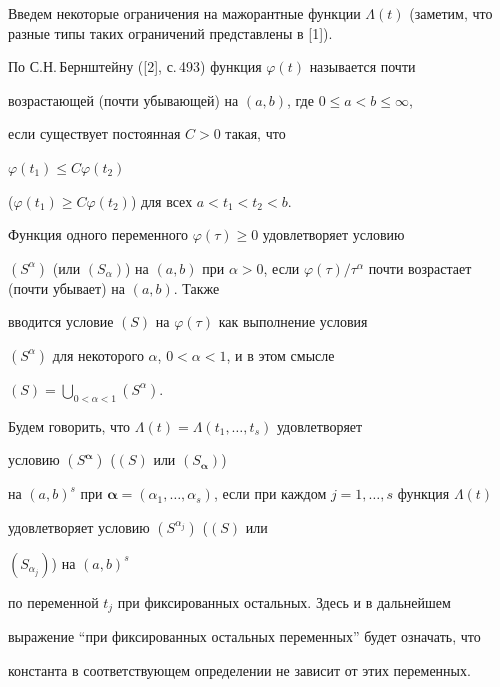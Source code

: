 Введем некоторые ограничения на мажорантные функции $\Lambda


(t)$ (заметим, что разные типы таких ограничений представлены в [1]).





По С.Н.\,Бернштейну ([2], с.\,493) функция $\varphi(t)$ называется почти


возрастающей (почти убывающей) на $(a,b)$, где $0\leq a<b\leq \infty$,


если существует постоянная $C>0$ такая, что 


$\varphi(t_1)\leq C\varphi(t_2)$ 


($\varphi(t_1) \geq C \varphi (t_2)$) для всех $a< t_1<t_2 <b$.





Функция одного переменного $\varphi(\tau) \geq 0$ удовлетворяет условию


$(S^{\alpha})$ (или $(S_{\alpha})$) на $(a,b)$ при $\alpha>0$, если $\varphi


(\tau)/\tau^{\alpha}$ почти возрастает (почти убывает) на $(a,b)$. Также 


вводится условие $(S)$ на $\varphi(\tau)$ как выполнение условия 


$(S^{\alpha})$ для некоторого ${\alpha}$, $0<{\alpha}<1$, и в этом смысле 


$(S)=\bigcup\limits_{0<{\alpha}<1} (S^{\alpha})$.





Будем говорить, что $\Lambda(t) = \Lambda(t_1, \dotsc, t_s)$ удовлетворяет 


условию $(S^{\boldsymbol{\alpha}})$ ($(S)$ или $(S_{\boldsymbol{\alpha}})$)


на $(a,b)^s$ при ${\boldsymbol{\alpha}}=(\alpha _1, \dotsc,


\alpha _s)$, если при каждом $ j=1,\dotsc,s$ функция $\Lambda(t)$ 


удовлетворяет условию $(S^{\alpha_j})$ ($(S)$ или


$(S_{\alpha_j})$) на $(a,b)^s$ 


по переменной $t_j$ при фиксированных остальных. Здесь и в дальнейшем


выражение ``при фиксированных остальных переменных'' будет означать, что 


константа в соответствующем определении не зависит от этих переменных.





